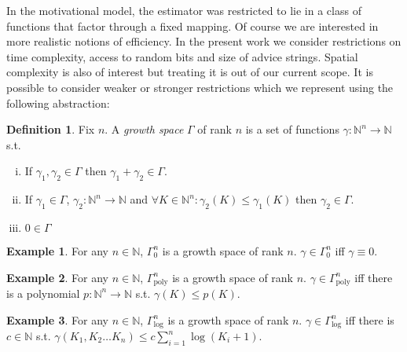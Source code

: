 \documentclass{article}
\theoremstyle{definition}
\newtheorem{definition}{Definition}[section]
\newtheorem{example}{Example}[section]
\theoremstyle{plain}
\newcommand{\Nats}{\mathbb{N}}
\begin{document}
In the motivational model, the estimator was restricted to lie in a class of functions that factor through a fixed mapping. Of course we are interested in more realistic notions of efficiency. In the present work we consider restrictions on time complexity, access to random bits and size of advice strings. Spatial complexity is also of interest but treating it is out of our current scope. It is possible to consider weaker or stronger restrictions which we represent using the following abstraction:

\begin{definition}

Fix $n$. A \emph{growth space} $\Gamma$ of rank $n$ is a set of functions ${\gamma: \Nats^n \rightarrow \Nats}$ s.t.

\begin{enumerate}[(i)]

\item If $\gamma_1, \gamma_2 \in \Gamma$ then $\gamma_1 + \gamma_2 \in \Gamma$.

\item If $\gamma_1 \in \Gamma$, $\gamma_2: \Nats^n \rightarrow \Nats$ and $\forall K \in \Nats^n: \gamma_2(K) \leq \gamma_1(K)$ then $\gamma_2 \in \Gamma$.

\item $0 \in \Gamma$

\end{enumerate}

\begin{example}

For any $n \in \Nats$, $\Gamma_0^n$ is a growth space of rank $n$. $\gamma \in \Gamma_0^n$ iff $\gamma \equiv 0$.

\end{example}

\end{definition}

\begin{example}

For any $n \in \Nats$, $\Gamma_{\text{poly}}^n$ is a growth space of rank $n$. $\gamma \in \Gamma_{\text{poly}}^n$ iff there is a polynomial $p: \Nats^n \rightarrow \Nats$ s.t. $\gamma(K) \leq p(K)$.

\end{example}

\begin{example}

For any $n \in \Nats$, $\Gamma_{\text{log}}^n$ is a growth space of rank $n$. $\gamma \in \Gamma_{\text{log}}^n$ iff there is $c \in \Nats$ s.t. $\gamma(K_1, K_2 \ldots K_n) \leq c \sum_{i=1}^n \log(K_i+1)$.

\end{example}
\end{document}
